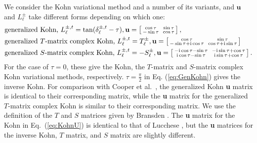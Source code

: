 \documentclass[preprint,showpacs,showkeys,preprintnumbers,amsmath,amssymb,longbibliography,pra,aps]{revtex4-1}
\newcommand{\ii}{{\rm{i}}}
\begin{document}
We consider the Kohn variational method and a number of its variants,
and $\textbf{u}$ and $L^{\pm}_\ell$ take
different forms depending on which one:
\begin{subequations}
\label{eq:KohnU}
\begin{align}
&\text{generalized Kohn, } L^{\pm,t}_\ell = \tan(\delta^{\pm,t}_\ell-\tau),
 \textbf{u} = \left[ \begin{smallmatrix}
\cos \tau & \ \sin \tau \\  -\sin \tau & \  \cos \tau
\end{smallmatrix} \right], \label{eq:GenKohn}\\
&\text{generalized $T$-matrix complex Kohn, } L^{\pm,t}_\ell = T_\ell^{\pm},
 \textbf{u} = \left[ \begin{smallmatrix}
\cos\tau & \ \sin\tau \\ -\sin\tau + \ii \cos\tau & \ \cos\tau + \ii \sin\tau
\end{smallmatrix} \right] \label{eq:GenTKohn} \\
&\text{generalized $S$-matrix complex Kohn, } L^{\pm,t}_\ell = -S_\ell^{\pm},
 \textbf{u} = \left[ \begin{smallmatrix}
-\ii \cos\tau - \sin\tau & \ -\ii\sin\tau + \cos\tau \\ 
 \ii\cos\tau - \sin\tau & \ \ii\sin\tau + \cos\tau
\end{smallmatrix} \right]. \label{eq:GenSKohn}
\end{align}
\end{subequations}
For the case of $\tau = 0$, these give the Kohn, the $T$-matrix and
$S$-matrix complex Kohn variational methods, respectively.
$\tau = \frac{\pi}{2}$ in Eq. (\ref{eq:GenKohn})
gives the inverse Kohn. 
For comparison with Cooper et al.\ \cite{Cooper2010}, the generalized
Kohn \textbf{u} matrix is identical to their corresponding matrix,
while the \textbf{u} matrix for the generalized $T$-matrix complex Kohn
is similar to their corresponding matrix.
We use the definition of the $T$ and $S$ matrices
given by Bransden \cite{Bransden1970}.
The \textbf{u} matrix for the Kohn in Eq.~(\ref{eq:KohnU}) is identical
to that of Lucchese \cite{Lucchese1989}, but the \textbf{u} matrices for
the inverse Kohn, $T$ matrix, and $S$ matrix are slightly different.
\end{document}
